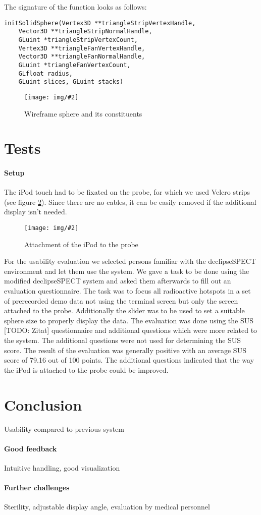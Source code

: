 \documentclass{scrartcl}
\newcommand{\graphic}[3][width=\linewidth] %
{
  \begin{figure}[h!t]
    \centering
    \texttt{[image: img/\#2]}
    \caption{#3}
    \label{fig:#2}
  \end{figure}
}
\newcommand{\refFigure}[1]{figure \ref{fig:#1}}
\begin{document}
The signature of the function looks as follows:
\begin{verbatim}
initSolidSphere(Vertex3D **triangleStripVertexHandle,
    Vector3D **triangleStripNormalHandle,
    GLuint *triangleStripVertexCount,
    Vertex3D **triangleFanVertexHandle,
    Vector3D **triangleFanNormalHandle,
    GLuint *triangleFanVertexCount,
    GLfloat radius,
    GLuint slices, GLuint stacks)
\end{verbatim}
\graphic[scale=.5]{sphere}{Wireframe sphere and its constituents}



\section{Tests}
\paragraph*{Setup}
The iPod touch had to be fixated on the probe, for which we used Velcro strips (see \refFigure{probe}). Since there are no cables, it can be easily removed if the additional display isn't needed.
\graphic[scale=.5]{probe}{Attachment of the iPod to the probe}

For the usability evaluation we selected persons familiar with the declipseSPECT environment and let them use the system. We gave a task to be done using the modified declipseSPECT system and asked them afterwards to fill out an evaluation questionnaire.
The task was to focus all radioactive hotspots in a set of prerecorded demo data not using the terminal screen but only the screen attached to the probe. Additionally the slider was to be used to set a suitable sphere size to properly display the data. The evaluation was done using the SUS [TODO: Zitat] questionnaire and additional questions which were more related to the system. The additional questions were not used for determining the SUS score.
The result of the evaluation was generally positive with an average SUS score of 79.16 out of 100 points. The additional questions indicated that the way the iPod is attached to the probe could be improved.



\section{Conclusion}
Usability compared to previous system
\paragraph*{Good feedback}
Intuitive handling, good visualization
\paragraph*{Further challenges}
Sterility, adjustable display angle, evaluation by medical personnel




\end{document}
